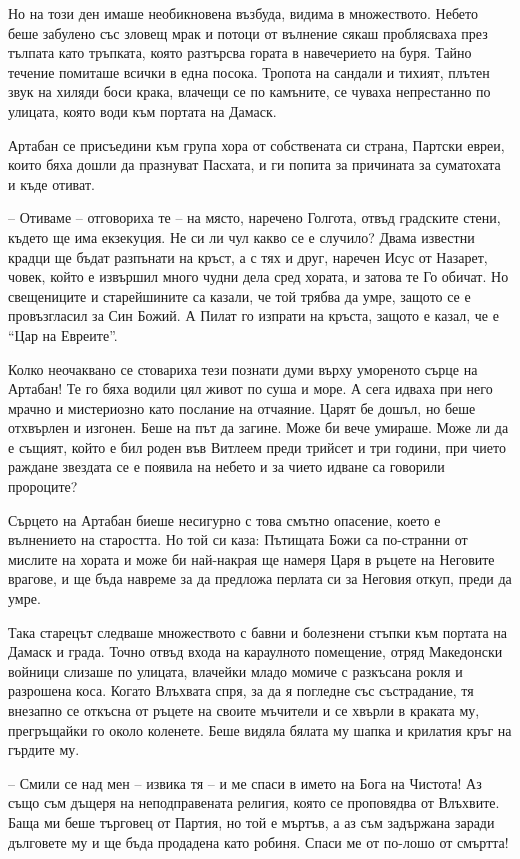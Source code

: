 Но на този ден имаше необикновена възбуда, видима в множеството. Небето беше
забулено със зловещ мрак и потоци от вълнение сякаш проблясваха през тълпата
като тръпката, която разтърсва гората в навечерието на буря. Тайно течение
помиташе всички в една посока. Тропота на сандали и тихият, плътен звук на
хиляди боси крака, влачещи се по камъните, се чуваха непрестанно по улицата,
която води към портата на Дамаск.

Артабан се присъедини към група хора от собствената си страна, Партски евреи,
които бяха дошли да празнуват Пасхата, и ги попита за причината за суматохата
и къде отиват.

-- Отиваме -- отговориха те -- на място, наречено Голгота, отвъд градските
стени, където ще има екзекуция. Не си ли чул какво се е случило? Двама известни
крадци ще бъдат разпънати на кръст, а с тях и друг, наречен Исус от Назарет,
човек, който е извършил много чудни дела сред хората, и затова те Го обичат. Но
свещениците и старейшините са казали, че той трябва да умре, защото се е
провъзгласил за Син Божий. А Пилат го изпрати на кръста, защото е казал, че е
``Цар на Евреите''.

Колко неочаквано се стовариха тези познати думи върху умореното сърце на
Артабан! Те го бяха водили цял живот по суша и море. А сега идваха при него
мрачно и мистериозно като послание на отчаяние. Царят бе дошъл, но беше
отхвърлен и изгонен. Беше на път да загине. Може би вече умираше. Може ли да е
същият, който е бил роден във Витлеем преди трийсет и три години, при чието
раждане звездата се е появила на небето и за чието идване са говорили пророците?

Сърцето на Артабан биеше несигурно с това смътно опасение, което
е вълнението на старостта. Но той си каза: Пътищата Божи са по-странни от
мислите на хората и може би най-накрая ще намеря Царя в ръцете на Неговите
врагове, и ще бъда навреме за да предложа перлата си за Неговия откуп, преди да
умре.

Така старецът следваше множеството с бавни и болезнени стъпки към портата на
Дамаск и града. Точно отвъд входа на караулното помещение, отряд Македонски
войници слизаше по улицата, влачейки младо момиче с разкъсана рокля и разрошена
коса. Когато Влъхвата спря, за да я погледне със състрадание, тя внезапно се
откъсна от ръцете на своите мъчители и се хвърли в краката му, прегръщайки го
около коленете. Беше видяла бялата му шапка и крилатия кръг на гърдите му.

-- Смили се над мен -- извика тя -- и ме спаси в името на Бога на Чистота! Аз
също съм дъщеря на неподправената религия, която се проповядва от Влъхвите. Баща
ми беше търговец от Партия, но той е мъртъв, а аз съм задържана заради дълговете
му и ще бъда продадена като робиня. Спаси ме от по-лошо от смъртта!


